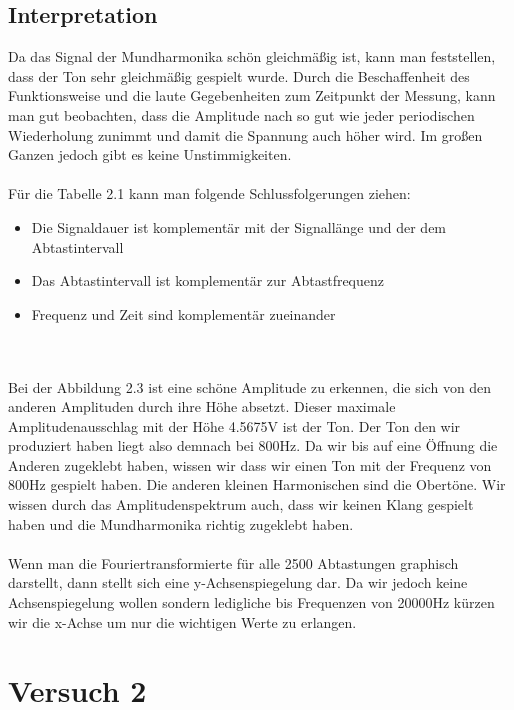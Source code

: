 \documentclass[12pt, oneside, a4paper, \docLanguage]{report}
\begin{document}
\section{Interpretation}
\label{chap:VERSUCH_1_INTERPRETATION}
Da das Signal der Mundharmonika schön gleichmäßig ist, kann man feststellen, dass der Ton sehr gleichmäßig gespielt wurde. 
\newline 
Durch die Beschaffenheit des Funktionsweise und die laute Gegebenheiten zum Zeitpunkt der Messung, kann man gut beobachten, dass die Amplitude nach so gut wie jeder periodischen Wiederholung zunimmt und damit die Spannung auch höher wird.
Im großen Ganzen jedoch gibt es keine Unstimmigkeiten.
\\~\\
Für die Tabelle 2.1 kann man folgende Schlussfolgerungen ziehen: ~\par
\begin{itemize}
	\item Die Signaldauer ist komplementär mit der Signallänge und der dem Abtastintervall
	\item Das Abtastintervall ist komplementär zur Abtastfrequenz
	\item Frequenz und Zeit sind komplementär zueinander
\end{itemize}
\\~\\
Bei der Abbildung 2.3 ist eine schöne Amplitude zu erkennen, die sich von den anderen Amplituden durch ihre Höhe absetzt.
Dieser maximale Amplitudenausschlag mit der Höhe 4.5675V ist der Ton.
\newline 
Der Ton den wir produziert haben liegt also demnach bei 800Hz. Da wir bis auf eine Öffnung die Anderen zugeklebt haben, wissen wir dass wir einen Ton mit der Frequenz von 800Hz gespielt haben. 
\newline
Die anderen kleinen Harmonischen sind die Obertöne.
Wir wissen durch das Amplitudenspektrum auch, dass wir keinen Klang gespielt haben und die Mundharmonika richtig zugeklebt haben.
\\~\\
Wenn man die Fouriertransformierte für alle 2500 Abtastungen graphisch darstellt, dann stellt sich eine y-Achsenspiegelung dar.
Da wir jedoch keine Achsenspiegelung wollen sondern ledigliche bis Frequenzen von 20000Hz kürzen wir die x-Achse um nur die wichtigen Werte zu erlangen.
%
%
\chapter{Versuch 2}
\label{chap:VERSUCH_2}
\end{document}
